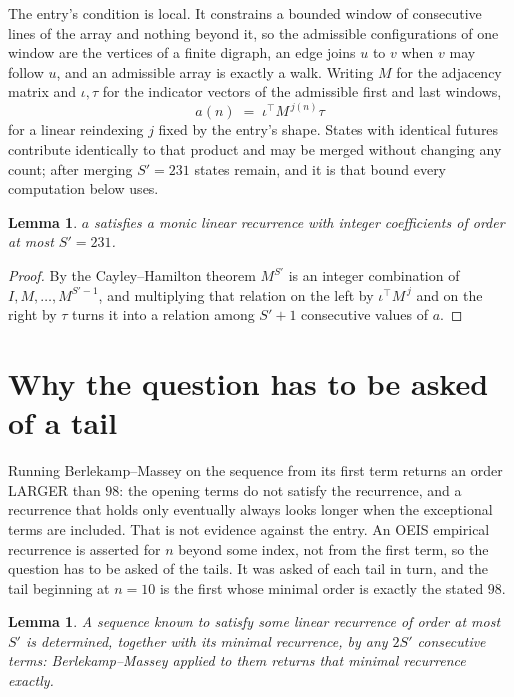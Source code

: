 \documentclass[11pt,a4paper]{article}
\theoremstyle{plain}
\newtheorem{lemma}[theorem]{Lemma}
\theoremstyle{definition}
\begin{document}
The entry's condition is local. It constrains a bounded window of consecutive lines of the
array and nothing beyond it, so the admissible configurations of one window are the vertices of
a finite digraph, an edge joins $u$ to $v$ when $v$ may follow $u$, and an admissible array is
exactly a walk. Writing $M$ for the adjacency matrix and $\iota,\tau$ for the indicator vectors
of the admissible first and last windows,
\[
a(n)\;=\;\iota^{\!\top}M^{\,j(n)}\tau
\]
for a linear reindexing $j$ fixed by the entry's shape. States with identical futures
contribute identically to that product and may be merged without changing any count; after
merging $S'=231$ states remain, and it is that bound every computation below uses.

\begin{lemma}\label{lem:cf}
$a$ satisfies a monic linear recurrence with integer coefficients of order at most $S'=231$.
\end{lemma}

\begin{proof}
By the Cayley--Hamilton theorem $M^{S'}$ is an integer combination of $I,M,\dots,M^{S'-1}$,
and multiplying that relation on the left by $\iota^{\!\top}M^{\,j}$ and on the right by
$\tau$ turns it into a relation among $S'+1$ consecutive values of $a$.
\end{proof}

\section{Why the question has to be asked of a tail}

Running Berlekamp--Massey on the sequence from its first term returns an order LARGER than $98$: the opening terms do not satisfy the recurrence, and a recurrence that holds only eventually always looks longer when the exceptional terms are included. That is not evidence against the entry. An OEIS empirical recurrence is asserted for $n$ beyond some index, not from the first term, so the question has to be asked of the tails. It was asked of each tail in turn, and the tail beginning at $n=10$ is the first whose minimal order is exactly the stated $98$.

\begin{lemma}\label{lem:bm}
A sequence known to satisfy some linear recurrence of order at most $S'$ is determined,
together with its minimal recurrence, by any $2S'$ consecutive terms: Berlekamp--Massey applied
to them returns that minimal recurrence exactly.
\end{lemma}
\end{document}
